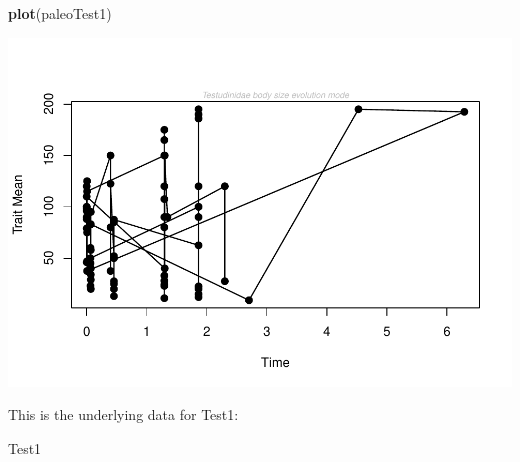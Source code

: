 \documentclass[]{article}
\newenvironment{Shaded}{\begin{snugshade}}{\end{snugshade}}
\newcommand{\KeywordTok}[1]{\textcolor[rgb]{0.13,0.29,0.53}{\textbf{{#1}}}}
\newcommand{\NormalTok}[1]{{#1}}
\begin{document}
\begin{Shaded}
\begin{Highlighting}[]
\KeywordTok{plot}\NormalTok{(paleoTest1)}
\end{Highlighting}
\end{Shaded}

\includegraphics{tortoise_notes_files/figure-latex/unnamed-chunk-2-1.pdf}

This is the underlying data for Test1:

\begin{Shaded}
\begin{Highlighting}[]
\NormalTok{Test1}
\end{Highlighting}
\end{Shaded}
\end{document}
